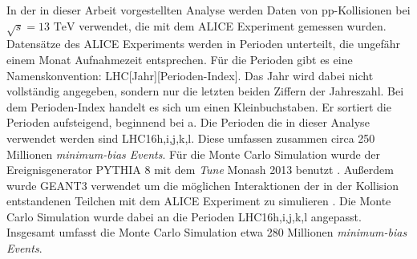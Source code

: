 In der in dieser Arbeit vorgestellten Analyse werden Daten von pp-Kollisionen bei $\sqrt{s}=13\text{ TeV}$ verwendet, die mit dem ALICE Experiment gemessen wurden.
Datensätze des ALICE Experiments werden in Perioden unterteilt, die ungefähr einem Monat Aufnahmezeit entsprechen.
Für die Perioden gibt es eine Namenskonvention: LHC[Jahr][Perioden-Index].
Das Jahr wird dabei nicht vollständig angegeben, sondern nur die letzten beiden Ziffern der Jahreszahl.
Bei dem Perioden-Index handelt es sich um einen Kleinbuchstaben.
Er sortiert die Perioden aufsteigend, beginnend bei a.
Die Perioden die in dieser Analyse verwendet werden sind LHC16h,i,j,k,l.
Diese umfassen zusammen circa 250 Millionen \textit{minimum-bias Events}.
\newline
Für die Monte Carlo Simulation wurde der Ereignisgenerator PYTHIA 8 mit dem \textit{Tune} Monash 2013 benutzt \cite{thesis:Krissy}.
Außerdem wurde GEANT3 verwendet um die möglichen Interaktionen der in der Kollision entstandenen Teilchen mit dem ALICE Experiment zu simulieren \cite{Brun:118715}.
Die Monte Carlo Simulation wurde dabei an die  Perioden LHC16h,i,j,k,l angepasst.
Insgesamt umfasst die Monte Carlo Simulation etwa 280 Millionen \textit{minimum-bias Events}.